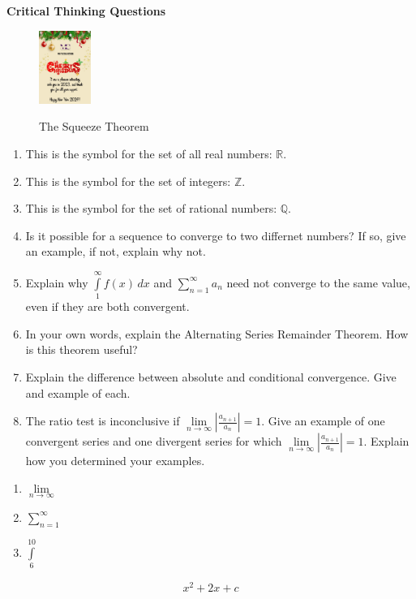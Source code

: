 \documentclass[10pt,letterpaper]{article}
\begin{document}
\textbf{Critical Thinking Questions}

\begin{figure}[H]
    \centering
    \includegraphics[width=0.15\textwidth]{poster!.jpg}\\
    \caption{The Squeeze Theorem}
\end{figure}

\begin{enumerate}
    \item This is the symbol for the set of all real numbers: $\mathbb{R}$.
    \item This is the symbol for the set of integers: $\mathbb{Z}$.
    \item This is the symbol for the set of rational numbers: $\mathbb{Q}$.
    \item Is it possible for a sequence to converge to two differnet numbers? If so, give an example, if not, explain why not.
    \item Explain why $\int\limits_{1}^{\infty}f(x)\,dx$ and $\sum\limits_{n=1}^{\infty} a_n$ need not converge to the same value, even if they are both convergent.
    \item In your own words, explain the Alternating Series Remainder Theorem. How is this theorem useful?
    \item Explain the difference between absolute and conditional convergence. Give and example of each.
    \item The ratio test is inconclusive if $\displaystyle{\lim\limits_{n \to \infty}\left|\frac{a_{n+1}}{a_n}\right| = 1}$. Give an example of one convergent series and one divergent series for which $\displaystyle{\lim\limits_{n \to \infty}\left|\frac{a_{n+1}}{a_n}\right| = 1}$. Explain how you determined your examples.
\end{enumerate}

\begin{enumerate}
    \item $\lim\limits_{n \to \infty}$
    \item $\sum\limits_{n=1}^{\infty}$
    \item $\int\limits_{6}^{10}$
\end{enumerate}

\begin{align}
    x^2+2x+c
\end{align}
\end{document}
